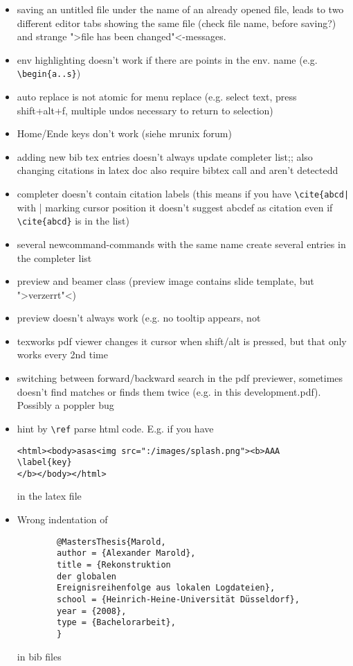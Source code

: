 \documentclass[10pt,a4paper,landscape]{report}
\begin{document}
\begin{itemize}
\item saving an untitled file under the name of an already opened file, leads to two different editor tabs showing the same file (check file name, before saving?) and strange ">file has been changed"<-messages.
\item  env highlighting doesn't work if there are points in the env. name (e.g. \verb+\begin{a..s}+)
\item auto replace is not atomic for menu replace (e.g. select text, press shift+alt+f, multiple undos necessary to return to selection)
\item Home/Ende keys don't work (siehe mrunix forum)
\item adding new bib tex entries doesn't always update completer list;; also changing citations in latex doc also require bibtex call and aren't detectedd
\item completer doesn't contain citation labels (this means if you have \verb+\cite{abcd|+ with | marking cursor position it doesn't suggest abcdef as citation even if \verb+\cite{abcd}+ is in the list)
\item several newcommand-commands with the same name create several entries in the completer list
\item preview and beamer class (preview image contains slide template, but ">verzerrt"<)
\item preview doesn't always work (e.g. no tooltip appears, not 
\item texworks pdf viewer changes it cursor when shift/alt is pressed, but that only works every 2nd time
\item switching between forward/backward search in the pdf previewer, sometimes doesn't find matches or finds them twice (e.g. in this development.pdf). Possibly a poppler bug
\item hint by \verb+\ref+ parse html code. E.g. if you have \begin{verbatim}
<html><body>asas<img src=":/images/splash.png"><b>AAA
\label{key}
</b></body></html>
\end{verbatim} in the latex file
	\item Wrong indentation of \begin{verbatim}
		@MastersThesis{Marold,
		author = {Alexander Marold},
		title = {Rekonstruktion 
		der globalen 
		Ereignisreihenfolge aus lokalen Logdateien},
		school = {Heinrich-Heine-Universität Düsseldorf},
		year = {2008},
		type = {Bachelorarbeit},
		}
	\end{verbatim} in bib files
\end{itemize} 
\end{document}
